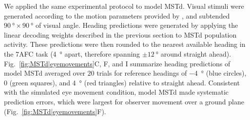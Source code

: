 
We applied the same experimental protocol to model \ac{MSTd}. Visual 
stimuli were generated according to the motion parameters provided by 
\cite{Royden1994}, and subtended $\SI{90}{\degree} \times \SI{90}{\degree}$
of visual angle. Heading predictions were generated by applying the linear
decoding weights described in the previous section to \ac{MSTd} population
activity. These predictions were then rounded to the nearest available 
heading in the 7AFC task (\SI{4}{\degree} apart, therefore spanning 
$\pm \SI{12}{\degree}$ around straight ahead). 
Fig.~\ref{fig:MSTd|eyemovements}C, F, and I summarize heading predictions
of model \ac{MSTd} averaged over $20$ trials for reference headings of 
\SI{-4}{\degree} (blue circles), $0$ (green squares), and \SI{+4}{\degree}
(red triangles) relative to straight ahead. Consistent with the simulated 
eye movement condition, model \ac{MSTd} made systematic prediction errors, 
which were largest for observer movement over a ground plane 
(Fig.~\ref{fig:MSTd|eyemovements}F).

